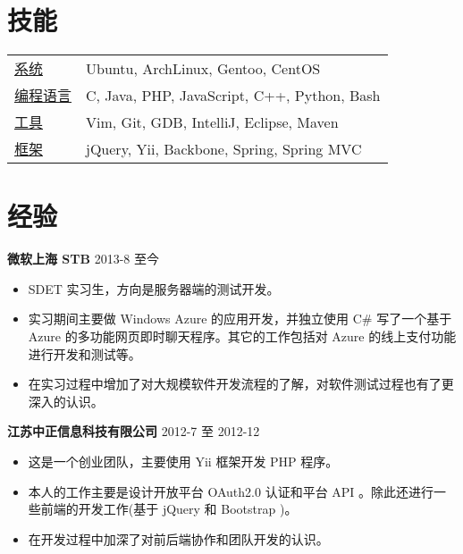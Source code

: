 \documentclass[margin]{res}
\begin{document}
 

\address{ 张启超 \\ }
\address{ 南京大学软件学院 2010级 本科 \\ (+86) 152-9838-8316  \\ \href{http://lecoding.com}{http://lecoding.com} \\ 
\href{mailto:njuzhangqichao@gmail.com}{njuzhangqichao@gmail.com} }

 
\begin{resume} 
 
\section{技能} 
   \begin{tabular}{l p{3in}}
      \underline{系统} &  Ubuntu, ArchLinux, Gentoo, CentOS \\
      \underline{编程语言} &  C, Java, PHP, JavaScript, C++, Python, Bash \\
      \underline{工具} & Vim, Git, GDB, IntelliJ, Eclipse, Maven \\
      \underline{框架} & jQuery, Yii, Backbone, Spring, Spring MVC
 \end{tabular}

\section{经验} 
{\bf 微软上海 STB} \hfill 2013-8 至今
\begin{itemize} \itemsep -2pt 
\item SDET 实习生，方向是服务器端的测试开发。
\item 实习期间主要做 Windows Azure 的应用开发，并独立使用 C\# 写了一个基于 Azure 的多功能网页即时聊天程序。其它的工作包括对 Azure 的线上支付功能进行开发和测试等。
\item 在实习过程中增加了对大规模软件开发流程的了解，对软件测试过程也有了更深入的认识。
\end{itemize}
{\bf 江苏中正信息科技有限公司} \hfill 2012-7 至 2012-12
\begin{itemize} \itemsep -2pt 
\item 这是一个创业团队，主要使用 Yii 框架开发 PHP 程序。
\item 本人的工作主要是设计开放平台 OAuth2.0 认证和平台 API 。除此还进行一些前端的开发工作(基于 jQuery 和 Bootstrap )。
\item 在开发过程中加深了对前后端协作和团队开发的认识。
\end{itemize}


\end{resume}
\end{document}
